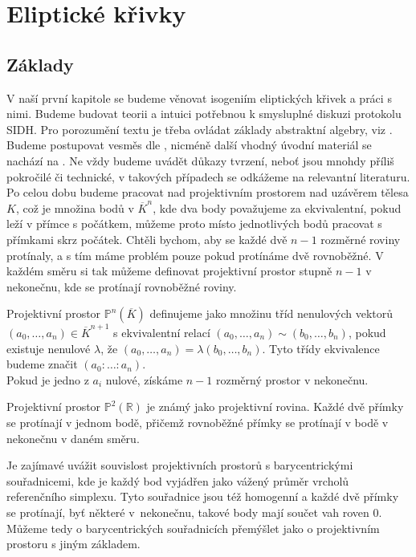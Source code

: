 \documentclass [12pt]{report}
\begin{document}
\chapter{Eliptické křivky}

\section{Základy}

V naší první kapitole se budeme věnovat isogeniím eliptických křivek a práci s nimi. Budeme budovat teorii a intuici potřebnou k smysluplné diskuzi protokolu SIDH. Pro porozumění textu je třeba ovládat základy abstraktní algebry, viz \cite{Rosicky}. Budeme postupovat vesměs dle \cite{DeFeo2}, nicméně další vhodný úvodní materiál se nachází na \cite{Sutherland}. Ne vždy budeme uvádět důkazy tvrzení, neboť jsou mnohdy příliš pokročilé či technické, v takových případech se odkážeme na relevantní literaturu. \\

Po celou dobu budeme pracovat nad projektivním prostorem nad uzávěrem tělesa $K$, což je množina bodů v $\overline{K}^n$, kde dva body považujeme za ekvivalentní, pokud leží v přímce s počátkem, můžeme proto místo jednotlivých bodů pracovat s přímkami skrz počátek. Chtěli bychom, aby se každé dvě $n-1$ rozměrné roviny protínaly, a s tím máme problém pouze pokud protínáme dvě rovnoběžné. V každém směru si tak můžeme definovat projektivní prostor stupně $n-1$ v nekonečnu, kde se protínají rovnoběžné roviny.

\begin{definice}
Projektivní prostor $\mathbb{P}^n (\overline{K})$ definujeme jako množinu tříd nenulových vektorů $(a_0, \dots, a_n) \in \overline{K}^{n+1}$ s ekvivalentní relací $(a_0, \dots, a_n) \sim (b_0, \dots, b_n)$, pokud existuje nenulové $\lambda$, že $(a_0, \dots, a_n) = \lambda (b_0, \dots, b_n)$. Tyto třídy ekvivalence budeme značit $(a_0 : \dots : a_n)$.\\

Pokud je jedno z $a_i$ nulové, získáme $n-1$ rozměrný prostor v nekonečnu.
\end{definice}

Projektivní prostor $\mathbb{P}^2 (\mathbb{R})$ je známý jako projektivní rovina. Každé dvě přímky se protínají v jednom bodě, přičemž rovnoběžné přímky se protínají v bodě v nekonečnu v daném směru.

\begin{poznamka}
Je zajímavé uvážit souvislost projektivních prostorů s barycentrickými souřadnicemi, kde je každý bod vyjádřen jako vážený průměr vrcholů referenčního simplexu. Tyto souřadnice jsou též homogenní a každé dvě přímky se protínají, byť některé v~nekonečnu, takové body mají součet vah roven $0$. Můžeme tedy o barycentrických souřadnicích přemýšlet jako o projektivním prostoru s jiným základem.
\end{poznamka}
\end{document}
